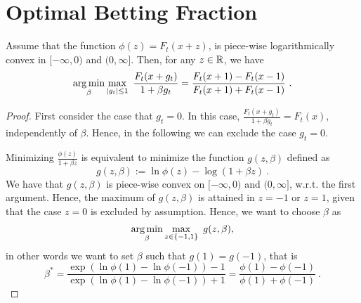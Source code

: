 \section{Optimal Betting Fraction}
\label{section:optimal-betting-fraction}

\begin{theorem}
\label{theo:opt_beta}
Assume that the function $\phi(z)=F_t(x+z)$, is piece-wise logarithmically
convex in $[-\infty,0)$ and $(0,\infty]$. Then, for any $z\in \mathbb{R}$, we have
\[
\argmin_{\beta} \max_{|g_t|\leq 1} \ \frac{F_t(x+g_t)}{1 + \beta g_t} =\frac{F_t(x+1) - F_t(x-1)}{F_t(x+1) + F_t(x-1)}~.
\]
\end{theorem}
\begin{proof}
First consider the case that $g_t=0$. In this case, $\frac{F_t(x+g_t)}{1 +
\beta g_t}=F_t(x)$, independently of $\beta$. Hence, in the following we can
exclude the case $g_t=0$.

Minimizing $\frac{\phi(z)}{1+\beta z}$ is equivalent to minimize the function $g(z,\beta)$ defined as
\[
g(z,\beta) := \ln \phi(z) - \log(1+\beta z)~.
\]
We have that $g(z,\beta)$ is piece-wise convex on $[-\infty,0)$ and
$(0,\infty]$, w.r.t. the first argument.  Hence, the maximum of $g(z,\beta)$ is
attained in $z=-1$ or $z=1$, given that the case $z=0$ is excluded by
assumption.  Hence, we want to choose $\beta$ as
\[
\argmin_{\beta} \max_{z \in \{-1, 1\}} \ g(z,\beta),
\]
in other words we want to set $\beta$ such that $g(1)=g(-1)$, that is
\[
\beta^* = \frac{\exp\left(\ln \phi(1) - \ln \phi(-1)\right)-1}{\exp\left(\ln \phi(1) - \ln \phi(-1)\right)+1}
= \frac{\phi(1) - \phi(-1)}{\phi(1) + \phi(-1)}~.
\]
\end{proof}
